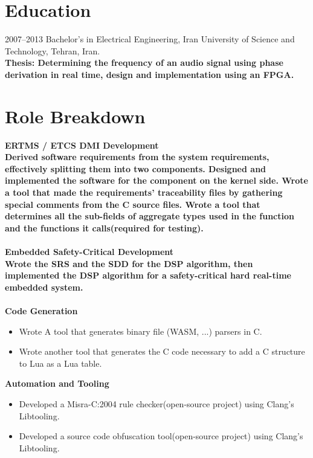 \documentclass[8pt]{article}
\begin{document}
\begin{multicols}{2}
  \section*{Education}
  2007--2013 Bachelor's in Electrical Engineering, Iran University of Science and Technology, Tehran, Iran.\\[5pt]
  \bf Thesis: \normalfont Determining the frequency of an audio signal using phase derivation in real time, design and implementation using an FPGA.

  \section*{Role Breakdown}
  \bf ERTMS / ETCS DMI Development\\ \normalfont Derived software requirements from the system requirements, effectively splitting them into two components. Designed and implemented the software for the component on the kernel side. Wrote a tool that made the requirements' traceability files by gathering special comments from the C source files. Wrote a tool that determines all the sub-fields of aggregate types used in the function and the functions it calls(required for testing).
  \\[5pt]\\
  \bf Embedded Safety-Critical Development\\ \normalfont Wrote the SRS and the SDD for the DSP algorithm, then implemented the DSP algorithm for a safety-critical hard real-time embedded system.
  \\[5pt]\\
  \bf Code Generation\\ \begin{itemize}\normalfont
    \vspace{-\baselineskip}
  \item Wrote A tool that generates binary file (WASM, ...) parsers in C.
  \item Wrote another tool that generates the C code necessary to add a C structure to Lua as a Lua table.
\end{itemize}
\bf Automation and Tooling\\ \begin{itemize}\normalfont
  \vspace{-\baselineskip}
\item Developed a Misra-C:2004 rule checker(open-source project) using Clang's Libtooling.
\item Developed a source code obfuscation tool(open-source project) using Clang's Libtooling.

\end{itemize}
\end{multicols}
\end{document}
